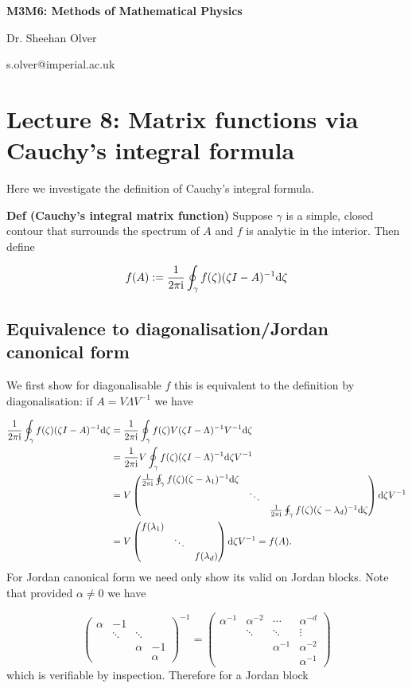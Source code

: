 \documentclass[12pt,a4paper]{article}
\def\D{ {\rm d} }
\def\I{ {\rm i} }
\def\sopmatrix#1{ \begin{pmatrix}#1\end{pmatrix} }
\begin{document}
\textbf{M3M6: Methods of Mathematical Physics}

Dr. Sheehan Olver

s.olver@imperial.ac.uk

\section{Lecture 8: Matrix  functions via Cauchy's integral formula}
Here we investigate the definition of Cauchy's integral formula.

\textbf{Def (Cauchy's integral  matrix function)} Suppose $\gamma$ is a simple, closed contour that surrounds the spectrum of $A$ and $f$ is analytic in the interior. Then define

\[
f(A) := {1 \over 2 \pi \I} \oint_\gamma f(\zeta)(\zeta I - A)^{-1} \D \zeta
\]
\subsection{Equivalence to diagonalisation/Jordan canonical form}
We first show for diagonalisable $f$ this is equivalent to the definition by diagonalisation: if $A = V \Lambda V^{-1}$ we have


\begin{align*}
{1 \over 2 \pi \I} \oint_\gamma f(\zeta)(\zeta I - A)^{-1} \D \zeta &= 
{1 \over 2 \pi \I} \oint_\gamma f(\zeta) V (\zeta I - \Lambda)^{-1} V^{-1} \D \zeta \\
&= {1 \over 2 \pi \I}  V \oint_\gamma f(\zeta)  (\zeta I - \Lambda)^{-1}  \D \zeta V^{-1}\\
&=  V \sopmatrix{ {1 \over 2 \pi \I} \oint_\gamma f(\zeta)  (\zeta - \lambda_1)^{-1} \D \zeta\\
&\ddots \\ && {1 \over 2 \pi \I} \oint_\gamma f(\zeta)  (\zeta - \lambda_d)^{-1} \D \zeta }  \D \zeta V^{-1} \\
&= V \sopmatrix{ f(\lambda_1)\\
&\ddots \\ && f(\lambda_d) }  \D \zeta V^{-1}  = f(A).
\end{align*}
For Jordan canonical form we need only show its valid on Jordan blocks. Note that provided $\alpha \neq 0$ we have

\[
\sopmatrix{\alpha  & -1 \\  
            & \ddots &\ddots \\
            &&\alpha & -1 \\ &&& \alpha}^{-1} = \sopmatrix{\alpha^{-1} & \alpha^{-2} & \cdots & \alpha^{-d} \\
                                                                    & \ddots& \ddots&\vdots \\
                                                                    & & \alpha^{-1} & \alpha^{-2} \\
                                                                    &&& \alpha^{-1}}
\]
which is verifiable by inspection. Therefore for a Jordan block
\end{document}
